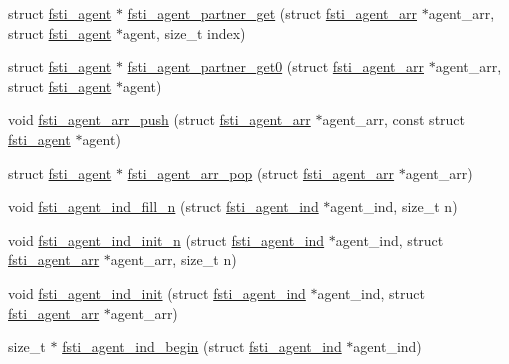 \begin{DoxyCompactItemize}
\item 
struct \mbox{\hyperlink{structfsti__agent}{fsti\+\_\+agent}} $\ast$ \mbox{\hyperlink{fsti-agent_8h_a8ea9850f51ba1cc3f842f3730cf22139}{fsti\+\_\+agent\+\_\+partner\+\_\+get}} (struct \mbox{\hyperlink{structfsti__agent__arr}{fsti\+\_\+agent\+\_\+arr}} $\ast$agent\+\_\+arr, struct \mbox{\hyperlink{structfsti__agent}{fsti\+\_\+agent}} $\ast$agent, size\+\_\+t index)
\item 
struct \mbox{\hyperlink{structfsti__agent}{fsti\+\_\+agent}} $\ast$ \mbox{\hyperlink{fsti-agent_8h_abe4c0c13ceb1a50eb8d9223a7122f269}{fsti\+\_\+agent\+\_\+partner\+\_\+get0}} (struct \mbox{\hyperlink{structfsti__agent__arr}{fsti\+\_\+agent\+\_\+arr}} $\ast$agent\+\_\+arr, struct \mbox{\hyperlink{structfsti__agent}{fsti\+\_\+agent}} $\ast$agent)
\item 
void \mbox{\hyperlink{fsti-agent_8h_a0cf9bb69026e48287e83f9d73841f90f}{fsti\+\_\+agent\+\_\+arr\+\_\+push}} (struct \mbox{\hyperlink{structfsti__agent__arr}{fsti\+\_\+agent\+\_\+arr}} $\ast$agent\+\_\+arr, const struct \mbox{\hyperlink{structfsti__agent}{fsti\+\_\+agent}} $\ast$agent)
\item 
struct \mbox{\hyperlink{structfsti__agent}{fsti\+\_\+agent}} $\ast$ \mbox{\hyperlink{fsti-agent_8h_a140245276760c5ca1467b816dfdb16d9}{fsti\+\_\+agent\+\_\+arr\+\_\+pop}} (struct \mbox{\hyperlink{structfsti__agent__arr}{fsti\+\_\+agent\+\_\+arr}} $\ast$agent\+\_\+arr)
\item 
void \mbox{\hyperlink{fsti-agent_8h_ad710a67a71582f5e8a63490c1afe3a3c}{fsti\+\_\+agent\+\_\+ind\+\_\+fill\+\_\+n}} (struct \mbox{\hyperlink{structfsti__agent__ind}{fsti\+\_\+agent\+\_\+ind}} $\ast$agent\+\_\+ind, size\+\_\+t n)
\item 
void \mbox{\hyperlink{fsti-agent_8h_a863d835b0643a8d62d8621bd512fd902}{fsti\+\_\+agent\+\_\+ind\+\_\+init\+\_\+n}} (struct \mbox{\hyperlink{structfsti__agent__ind}{fsti\+\_\+agent\+\_\+ind}} $\ast$agent\+\_\+ind, struct \mbox{\hyperlink{structfsti__agent__arr}{fsti\+\_\+agent\+\_\+arr}} $\ast$agent\+\_\+arr, size\+\_\+t n)
\item 
void \mbox{\hyperlink{fsti-agent_8h_a15fb161e3b2c757f6dc7d67af4e6ef3d}{fsti\+\_\+agent\+\_\+ind\+\_\+init}} (struct \mbox{\hyperlink{structfsti__agent__ind}{fsti\+\_\+agent\+\_\+ind}} $\ast$agent\+\_\+ind, struct \mbox{\hyperlink{structfsti__agent__arr}{fsti\+\_\+agent\+\_\+arr}} $\ast$agent\+\_\+arr)
\item 
size\+\_\+t $\ast$ \mbox{\hyperlink{fsti-agent_8h_af8ec082c043d0719f2933f78c9b74879}{fsti\+\_\+agent\+\_\+ind\+\_\+begin}} (struct \mbox{\hyperlink{structfsti__agent__ind}{fsti\+\_\+agent\+\_\+ind}} $\ast$agent\+\_\+ind)

\end{DoxyCompactItemize}
